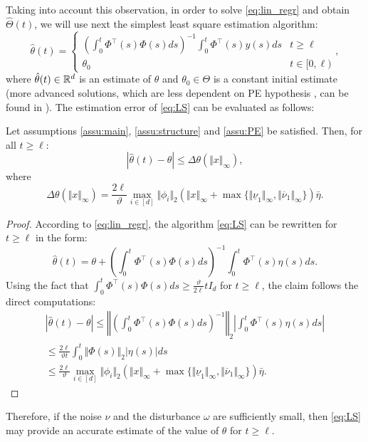 \documentclass[letterpaper, 10 pt, conference]{ieeeconf}  %
\begin{document}
Taking into account this observation, in order to solve \eqref{eq:lin_regr}
and obtain $\hat{\Theta}(t)$, we will use next the simplest least
square estimation algorithm:
\begin{equation}
\hat{\theta}(t)=\begin{cases}
\left(\int_{0}^{t}\Phi^{\top}(s)\Phi(s)ds\right)^{-1}\int_{0}^{t}\Phi^{\top}(s)y(s)ds & t\geq\ell\\
\theta_{0} & t\in[0,\ell)
\end{cases},\label{eq:LS}
\end{equation}
where $\hat{\theta}(t)\in\mathbb{R}^{d}$ is an estimate of $\theta$ and
$\theta_{0}\in\Theta$ is a constant initial estimate (more advanced
solutions, which are less dependent on PE hypothesis \cite{Efimov2015,Efimov_PE2018},
can be found in \cite{Chowdhary2012,Wang2019a}). The estimation error
of \eqref{eq:LS} can be evaluated as follows: 
\begin{proposition}
\label{prop:LS} Let assumptions \ref{assu:main}, \ref{assu:structure}
and \ref{assu:PE} be satisfied. Then, for all $t\geq\ell$:
\[
|\hat{\theta}(t)-\theta|\leq\Delta\theta(\Vert x\Vert_{\infty}),
\]
where
\[
\Delta\theta(\Vert x\Vert_{\infty})=\frac{2\ell}{\vartheta}\max_{i\in[d]}\Vert\phi_{i}\Vert_{2}(\Vert x\Vert_{\infty}+\max\{\Vert\underline{\nu}_{1}\Vert_{\infty},\Vert\overline{\nu}_{1}\Vert_{\infty}\})\bar{\eta}.
\]
\end{proposition}
\begin{proof}
According to \eqref{eq:lin_regr}, the algorithm \eqref{eq:LS} can
be rewritten for $t\geq\ell$ in the form:
\[
\hat{\theta}(t)=\theta+\left(\int_{0}^{t}\Phi^{\top}(s)\Phi(s)ds\right)^{-1}\int_{0}^{t}\Phi^{\top}(s)\eta(s)ds.
\]
Using the fact that $\int_{0}^{t}\Phi^{\top}(s)\Phi(s)ds\geq\frac{\vartheta}{2\ell}tI_{d}$
for $t\geq\ell$, the claim follows the direct computations:
\begin{gather*}
|\hat{\theta}(t)-\theta|\leq\left\Vert \left(\int_{0}^{t}\Phi^{\top}(s)\Phi(s)ds\right)^{-1}\right\Vert _{2}\left|\int_{0}^{t}\Phi^{\top}(s)\eta(s)ds\right|\\
\leq\frac{2\ell}{\vartheta t}\int_{0}^{t}\Vert\Phi(s)\Vert_{2}|\eta(s)|ds\\
\leq\frac{2\ell}{\vartheta}\max_{i\in[d]}\Vert\phi_{i}\Vert_{2}(\Vert x\Vert_{\infty}+\max\{\Vert\underline{\nu}_{1}\Vert_{\infty},\Vert\overline{\nu}_{1}\Vert_{\infty}\})\bar{\eta}.
\end{gather*}
\end{proof}
Therefore, if the noise $\nu$ and the disturbance $\omega$ are sufficiently
small, then \eqref{eq:LS} may provide an accurate estimate of the
value of $\theta$ for $t\geq\ell$.
\end{document}
